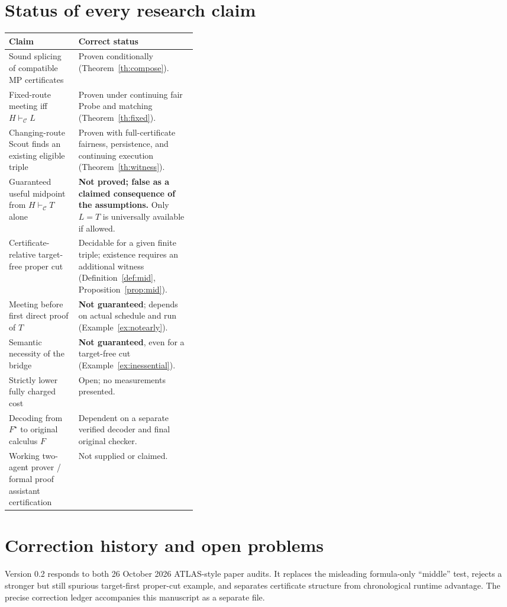 \documentclass[11pt,letterpaper]{article}
\theoremstyle{definition}
\newcommand{\vdC}{\vdash_{\mathcal C}}
\begin{document}
\section{Status of every research claim}
\small
\begin{tabularx}{\linewidth}{@{}>{\raggedright\arraybackslash}p{0.37\linewidth}X@{}}
\toprule
\textbf{Claim} & \textbf{Correct status}\\\midrule
Sound splicing of compatible MP certificates & Proven conditionally (Theorem~\ref{th:compose}).\\
Fixed-route meeting iff $H\vdC L$ & Proven under continuing fair Probe and matching (Theorem~\ref{th:fixed}).\\
Changing-route Scout finds an existing eligible triple & Proven with full-certificate fairness, persistence, and continuing execution (Theorem~\ref{th:witness}).\\
Guaranteed useful midpoint from $H\vdC T$ alone & \textbf{Not proved; false as a claimed consequence of the assumptions.} Only $L=T$ is universally available if allowed.\\
Certificate-relative target-free proper cut & Decidable for a given finite triple; existence requires an additional witness (Definition~\ref{def:mid}, Proposition~\ref{prop:mid}).\\
Meeting before first direct proof of $T$ & \textbf{Not guaranteed}; depends on actual schedule and run (Example~\ref{ex:notearly}).\\
Semantic necessity of the bridge & \textbf{Not guaranteed}, even for a target-free cut (Example~\ref{ex:inessential}).\\
Strictly lower fully charged cost & Open; no measurements presented.\\
Decoding from $F^\star$ to original calculus $F$ & Dependent on a separate verified decoder and final original checker.\\
Working two-agent prover / formal proof assistant certification & Not supplied or claimed.\\
\bottomrule
\end{tabularx}
\normalsize

\section{Correction history and open problems}
Version 0.2 responds to both 26 October 2026 ATLAS-style paper audits. It
replaces the misleading formula-only ``middle'' test, rejects a stronger
but still spurious target-first proper-cut example, and separates
certificate structure from chronological runtime advantage. The precise
correction ledger accompanies this manuscript as a separate file.
\end{document}
